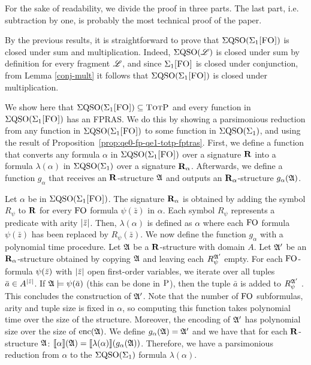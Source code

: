
For the sake of readability, we divide the proof in three parts. The last part, i.e. subtraction by one, is probably the most technical proof of the paper. 

\medskip

 By the previous results, it is straightforward to prove that $\Sigma{\rm QSO}(\Sigma_{1}\textsc{[FO]})$ is closed under sum and multiplication. Indeed, $\Sigma{\rm QSO}(\mathscr{L})$ is closed under sum by definition for every fragment $\mathscr{L}$, and since $\Sigma_{1}\textsc{[FO]}$ is closed under conjunction, from Lemma \ref{conj-mult} it follows that $\Sigma{\rm QSO}(\Sigma_{1}\textsc{[FO]})$ is closed under multiplication.
\medskip

  We show here that $\Sigma{\rm QSO}(\Sigma_{1}\textsc{[FO]}) \subseteq \text{\sc TotP}$ and every function in $\Sigma{\rm QSO}(\Sigma_{1}\textsc{[FO]})$ has an FPRAS. We do this by showing a parsimonious reduction from any function in $\Sigma{\rm QSO}(\Sigma_{1}\textsc{[FO]})$ to some function in $\Sigma{\rm QSO}(\Sigma_{1})$, and using the result of Proposition~\ref{prop:qe0-fp-qe1-totp-fptras}. First, we define a function that converts any formula $\alpha$ in $\Sigma{\rm QSO}(\Sigma_{1}\textsc{[FO]})$ over a signature $\mathbf{R}$ into a formula $\lambda(\alpha)$ in $\Sigma{\rm QSO}(\Sigma_{1})$ over a signature $\mathbf{R}_{\alpha}$. Afterwards, we define a function $g_{\alpha}$ that receives an $\mathbf{R}$-structure $\mathfrak{A}$ and outputs an $\mathbf{R}_{\alpha}$-structure $g_{\alpha}(\mathfrak{A})$.

Let $\alpha$ be in $\Sigma{\rm QSO}(\Sigma_{1}\textsc{[FO]})$. The signature $\mathbf{R}_{\alpha}$ is obtained by adding the symbol $R_{\psi}$ to $\mathbf{R}$ for every ${\rm FO}$ formula $\psi(\bar{z})$ in $\alpha$. Each symbol $R_{\psi}$ represents a predicate with arity $\vert \bar{z} \vert$. Then, $\lambda(\alpha)$ is defined as $\alpha$ where each ${\rm FO}$ formula $\psi(\bar{z})$ has been replaced by $R_{\psi}(\bar{z})$. We now define the function $g_{\alpha}$ with a polynomial time procedure. Let $\mathfrak{A}$ be a $\mathbf{R}$-structure with domain $A$. Let $\mathfrak{A}'$ be an $\mathbf{R}_{\alpha}$-structure obtained by copying $\mathfrak{A}$ and leaving each $R_{\psi}^{\mathfrak{A}'}$ empty. For each ${\rm FO}$-formula $\psi(\bar{z})$ with $\vert \bar{z} \vert$ open first-order variables, we iterate over all tuples $\bar{a} \in A^{\vert \bar{z} \vert}$. If $\mathfrak{A}\models\psi(\bar{a})$ (this can be done in $\text{\sc P}$), then the tuple $\bar{a}$ is added to $R_{\psi}^{\mathfrak{A}'}$ . This concludes the construction of $\mathfrak{A}'$. Note that the number of ${\rm FO}$ subformulas, arity and tuple size is fixed in $\alpha$, so computing this function takes polynomial time over the size of the structure. Moreover, the encoding of $\mathfrak{A}'$ has polynomial size over the size of ${\rm enc}(\mathfrak{A})$. We define $g_{\alpha}(\mathfrak{A}) = \mathfrak{A}'$ and we have that for each $\mathbf{R}$-structure $\mathfrak{A}$: ${\llbracket{}{\alpha}\rrbracket}(\mathfrak{A}) = {\llbracket{}{\lambda(\alpha)}\rrbracket}(g_{\alpha}(\mathfrak{A}))$. Therefore, we have a parsimonious reduction from $\alpha$ to the $\Sigma{\rm QSO}(\Sigma_{1})$ formula $\lambda(\alpha)$.

